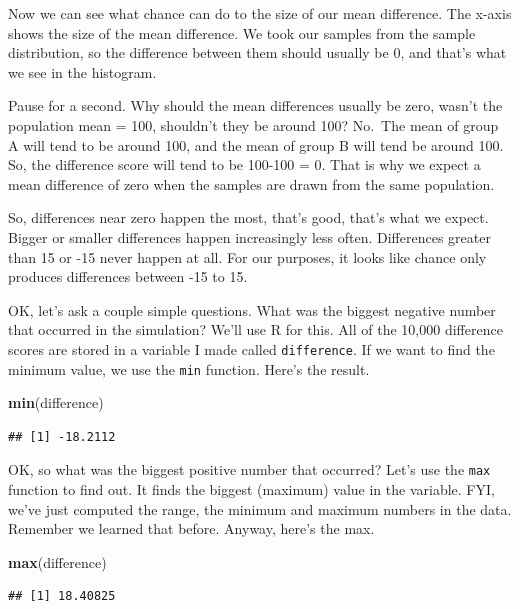\documentclass[]{book}
\newenvironment{Shaded}{\begin{snugshade}}{\end{snugshade}}
\newcommand{\KeywordTok}[1]{\textcolor[rgb]{0.13,0.29,0.53}{\textbf{#1}}}
\newcommand{\NormalTok}[1]{#1}
\begin{document}
Now we can see what chance can do to the size of our mean difference. The x-axis shows the size of the mean difference. We took our samples from the sample distribution, so the difference between them should usually be 0, and that's what we see in the histogram.

Pause for a second. Why should the mean differences usually be zero, wasn't the population mean = 100, shouldn't they be around 100? No.~The mean of group A will tend to be around 100, and the mean of group B will tend be around 100. So, the difference score will tend to be 100-100 = 0. That is why we expect a mean difference of zero when the samples are drawn from the same population.

So, differences near zero happen the most, that's good, that's what we expect. Bigger or smaller differences happen increasingly less often. Differences greater than 15 or -15 never happen at all. For our purposes, it looks like chance only produces differences between -15 to 15.

OK, let's ask a couple simple questions. What was the biggest negative number that occurred in the simulation? We'll use R for this. All of the 10,000 difference scores are stored in a variable I made called \texttt{difference}. If we want to find the minimum value, we use the \texttt{min} function. Here's the result.

\begin{Shaded}
\begin{Highlighting}[]
\KeywordTok{min}\NormalTok{(difference)}
\end{Highlighting}
\end{Shaded}

\begin{verbatim}
## [1] -18.2112
\end{verbatim}

OK, so what was the biggest positive number that occurred? Let's use the \texttt{max} function to find out. It finds the biggest (maximum) value in the variable. FYI, we've just computed the range, the minimum and maximum numbers in the data. Remember we learned that before. Anyway, here's the max.

\begin{Shaded}
\begin{Highlighting}[]
\KeywordTok{max}\NormalTok{(difference)}
\end{Highlighting}
\end{Shaded}

\begin{verbatim}
## [1] 18.40825
\end{verbatim}
\end{document}
